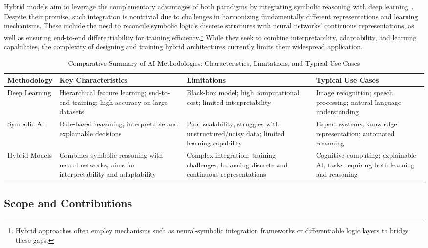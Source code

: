 \documentclass[sigconf]{acmart}
\begin{document}
Hybrid models aim to leverage the complementary advantages of both paradigms by integrating symbolic reasoning with deep learning~\cite{chen2022hybrid}. Despite their promise, such integration is nontrivial due to challenges in harmonizing fundamentally different representations and learning mechanisms. These include the need to reconcile symbolic logic's discrete structures with neural networks' continuous representations, as well as ensuring end-to-end differentiability for training efficiency.\footnote{Hybrid approaches often employ mechanisms such as neural-symbolic integration frameworks or differentiable logic layers to bridge these gaps.} While they seek to combine interpretability, adaptability, and learning capabilities, the complexity of designing and training hybrid architectures currently limits their widespread application.

\begin{table*}[htbp]
\centering
\caption{Comparative Summary of AI Methodologies: Characteristics, Limitations, and Typical Use Cases}
\label{tab:ai-methodologies-comparison}
\begin{adjustbox}{max width=\textwidth}
\begin{tabular}{@{}llll@{}}
\toprule
\textbf{Methodology} & \textbf{Key Characteristics} & \textbf{Limitations} & \textbf{Typical Use Cases} \\ \midrule
Deep Learning & Hierarchical feature learning; end-to-end training; high accuracy on large datasets & Black-box model; high computational cost; limited interpretability & Image recognition; speech processing; natural language understanding \\[6pt]
Symbolic AI & Rule-based reasoning; interpretable and explainable decisions & Poor scalability; struggles with unstructured/noisy data; limited learning capability & Expert systems; knowledge representation; automated reasoning \\[6pt]
Hybrid Models & Combines symbolic reasoning with neural networks; aims for interpretability and adaptability & Complex integration; training challenges; balancing discrete and continuous representations & Cognitive computing; explainable AI; tasks requiring both learning and reasoning \\ 
\bottomrule
\end{tabular}
\end{adjustbox}
\end{table*}

\subsection{Scope and Contributions}
\end{document}
